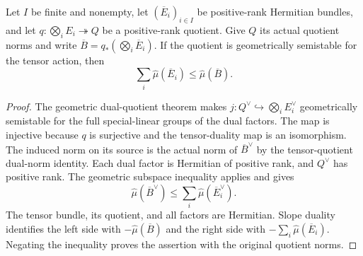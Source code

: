 \begin{theorem}
\label{thm:finite-geometric-quotient-bound}
\leanok
Let $I$ be finite and nonempty, let $(\overline E_i)_{i\in I}$ be positive-rank
Hermitian bundles, and let $q:\bigotimes_i E_i\twoheadrightarrow Q$ be a
positive-rank quotient. Give $Q$ its actual quotient norms and write
$\overline B=q_*(\bigotimes_i\overline E_i)$. If the quotient is geometrically
semistable for the tensor action, then
\[
 \sum_i\widehat\mu(\overline E_i)\leq\widehat\mu(\overline B).
\]
\end{theorem}
\begin{proof}
The geometric dual-quotient theorem makes
$j:Q^{\vee}\hookrightarrow\bigotimes_i E_i^{\vee}$ geometrically semistable
for the full special-linear groups of the dual factors. The map is injective
because $q$ is surjective and the tensor-duality map is an isomorphism.
The induced norm on its source is the actual norm of $\overline B^{\vee}$
by the tensor-quotient dual-norm identity. Each dual factor is Hermitian
of positive rank, and $Q^{\vee}$ has positive rank. The geometric subspace
inequality applies and gives
\[
 \widehat\mu(\overline B^{\vee})
     \leq\sum_i\widehat\mu(\overline E_i^{\vee}).
\]
The tensor bundle, its quotient, and all factors are Hermitian. Slope duality
identifies the left side with $-\widehat\mu(\overline B)$ and the right side
with $-\sum_i\widehat\mu(\overline E_i)$. Negating the inequality proves the
assertion with the original quotient norms.
\end{proof}

